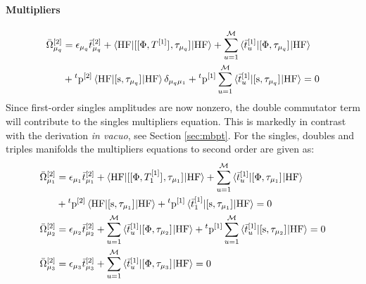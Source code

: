 \paragraph*{Multipliers}
\begin{equation}\label{eq:2nd-order-mult}
  \begin{aligned}
  \bar{\Omega}_{\mu_q}^{[2]} &=
    \epsilon_{\mu_q}\bar{t}_{\mu_q}^{[2]}
    + \braket{\mathrm{HF} | [ [ \Phi, T^{[1]} ]^{}, \tau_{\mu_q} ]^{} | \mathrm{HF}}
    + \sum_{u=1}^\mathcal{M}\braket{\bar{t}_{u}^{[1]} |
    [ \Phi, \tau_{\mu_q} ]^{} | \mathrm{HF}} \\
    &+ {}^t\mathrm{p}^{[2]}\braket{\mathrm{HF} |
    [ \mathrm{s}, \tau_{\mu_q} ]^{} | \mathrm{HF}}\delta_{\mu_q\mu_1}
    + {}^t\mathrm{p}^{[1]}
    \sum_{u=1}^\mathcal{M}\braket{\bar{t}_{u}^{[1]} |
    [ \mathrm{s}, \tau_{\mu_q} ]^{} | \mathrm{HF}}
    =0
  \end{aligned}
\end{equation}
Since first-order singles amplitudes are now nonzero, the double
commutator term will contribute to the singles multipliers equation.
This is markedly in contrast with the derivation \emph{in vacuo}, see
Section \ref{sec:mbpt}.\autocite{Koch1997-nm, Helgaker2000-tz}
For the singles, doubles and triples manifolds the multipliers equations
to second order are given as:
\begin{subequations}
  \begin{align}
    \bar{\Omega}_{\mu_1}^{[2]} &=
      \epsilon_{\mu_1}\bar{t}_{\mu_1}^{[2]}
      + \braket{\mathrm{HF} |
      [ [ \Phi, T_1^{[1]} ]^{}, \tau_{\mu_1} ]^{} | \mathrm{HF}}
      + \sum_{u=1}^\mathcal{M}\braket{\bar{t}_{u}^{[1]} |
      [ \Phi, \tau_{\mu_1} ]^{} | \mathrm{HF}} \nonumber \\
      &+ {}^t\mathrm{p}^{[2]}\braket{\mathrm{HF} |
      [ \mathrm{s}, \tau_{\mu_1} ]^{} | \mathrm{HF}}
      + {}^t\mathrm{p}^{[1]}
      \braket{\bar{t}_{1}^{[1]} |
      [ \mathrm{s}, \tau_{\mu_1} ]^{} | \mathrm{HF}}
      =0 \\
    \bar{\Omega}_{\mu_2}^{[2]} &=
      \epsilon_{\mu_2}\bar{t}_{\mu_2}^{[2]}
      + \sum_{u=1}^\mathcal{M}\braket{\bar{t}_{u}^{[1]} |
      [ \Phi, \tau_{\mu_2} ]^{} | \mathrm{HF}}
      + {}^t\mathrm{p}^{[1]}
      \sum_{u=1}^\mathcal{M}\braket{\bar{t}_{u}^{[1]} |
      [ \mathrm{s}, \tau_{\mu_2} ]^{} | \mathrm{HF}}
      =0 \\
    \bar{\Omega}_{\mu_3}^{[2]} &=
      \epsilon_{\mu_3}\bar{t}_{\mu_3}^{[2]}
      + \sum_{u=1}^\mathcal{M}\braket{\bar{t}_{u}^{[1]} |
      [ \Phi, \tau_{\mu_3} ]^{} | \mathrm{HF}}
      =0
  \end{align}
\end{subequations}
